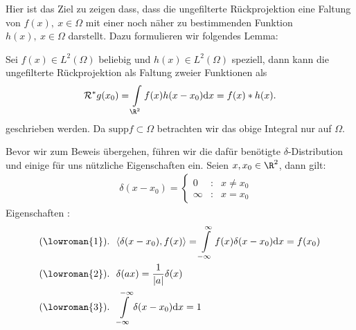 Hier ist das Ziel zu zeigen dass, dass die ungefilterte Rückprojektion eine Faltung von $f(x) , \ x \in \Omega$ mit einer noch näher zu bestimmenden Funktion $h(x), \ x \in \Omega$ darstellt. Dazu formulieren wir folgendes Lemma:
\begin{lemma}
	Sei $f(x) \in L^2(\Omega)$ beliebig und $h(x) \in L^2(\Omega)$ speziell, dann kann die ungefilterte Rückprojektion als Faltung zweier Funktionen als
	\[ \mathcal{R^*} g(x_0) = \int \limits_{\R^2} f(x)h(x-x_0) \mbox{d}x = f(x)*h(x).\]	
	geschrieben werden. Da $\mbox{supp}f \subset \Omega$ betrachten wir das obige Integral nur auf $\Omega$.
	\label{lemma:3}
\end{lemma}
\begin{Bemerkung}
	Bevor wir zum Beweis übergehen, führen wir die dafür benötigte $\delta$-Distribution und einige für uns nützliche Eigenschaften ein. Seien $x, x_0 \in \R^2$, dann gilt:
	\begin{align}
	   	&  \ \  \delta(x-x_0) = \left\{ \begin{matrix} 0 & : &  x \neq x_0 \\ \infty & : & x = x_0 \end{matrix}\right. \label{equa:3.8}
   	\end{align}
	Eigenschaften :
	\begin{align}
		(\lowroman{1}).  &  \ \ \langle \delta(x-x_0), f(x)\rangle = \int \limits_{-\infty}^{\infty} f(x)\delta(x-x_0)\mbox{d}x = f(x_0) \label{equa:3.9}\\
		(\lowroman{2}). &  \ \  \delta(ax) = \frac{1}{|a|}\delta(x) \label{equa:3.10} \\
		(\lowroman{3}). &  \ \  \int \limits_{-\infty}^{-\infty}\delta(x-x_0) \mbox{d}x = 1 \label{equa:3.11}
	\end{align}
	\label{bem:8}
\end{Bemerkung}
